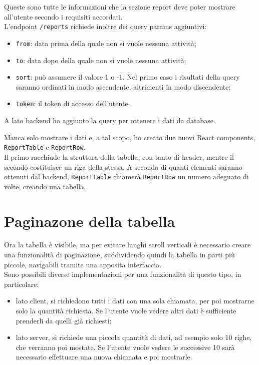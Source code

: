 Queste sono tutte le informazioni che la sezione report deve poter mostrare all'utente secondo i requisiti accordati.\\
L'endpoint \texttt{/reports} richiede inoltre dei query params aggiuntivi:
\begin{itemize}
  \item \texttt{from}: data prima della quale non si vuole nessuna attività;
  \item \texttt{to}: data dopo della quale non si vuole nessuna attività;
  \item \texttt{sort}: può assumere il valore 1 o -1. Nel primo caso i risultati della query saranno ordinati in modo ascendente, altrimenti in modo discendente;
  \item \texttt{token}: il token di accesso dell'utente.
\end{itemize}

A lato backend ho aggiunto la query per ottenere i dati da database.

Manca solo mostrare i dati e, a tal scopo, ho creato due nuovi React components, \texttt{ReportTable} e \texttt{ReportRow}.\\
Il primo racchiude la struttura della tabella, con tanto di header, mentre il secondo costituisce un riga della stessa. A seconda di quanti elementi saranno ottenuti dal backend, \texttt{ReportTable} chiamerà \texttt{ReportRow} un numero adeguato di volte, creando una tabella.

\section{Paginazone della tabella}

Ora la tabella è visibile, ma per evitare lunghi scroll verticali è necessario creare una funzionalità di paginazione, suddividendo quindi la tabella in parti più piccole, navigabili tramite una apposita interfaccia.\\
Sono possibili diverse implementazioni per una funzionalità di questo tipo, in particolare:
\begin{itemize}
  \item lato client, si richiedono tutti i dati con una sola chiamata, per poi mostrarne solo la quantità richiesta. Se l'utente vuole vedere altri dati è sufficiente prenderli da quelli già richiesti;
  \item lato server, si richiede una piccola quantità di dati, ad esempio solo 10 righe, che verranno poi mostate. Se l'utente vuole vedere le successive 10 sarà necessario effettuare una nuova chiamata e poi mostrarle. 
\end{itemize}

